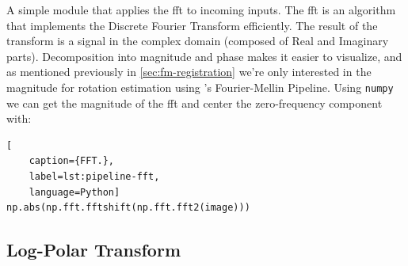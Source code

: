 A simple module that applies the \acrshort{fft} to incoming inputs. The \acrshort{fft} is an algorithm that implements the Discrete Fourier Transform efficiently. The result of the transform is a signal in the complex domain (composed of Real and Imaginary parts). Decomposition into magnitude and phase makes it easier to visualize, and as mentioned previously in \autoref{sec:fm-registration} we're only interested in the magnitude for rotation estimation using \citeauthor{Reddy1996}'s Fourier-Mellin Pipeline. Using \texttt{numpy} we can get the magnitude of the \acrshort{fft} and center the zero-frequency component with:

\begin{lstlisting}[
    caption={FFT.},
    label=lst:pipeline-fft,
    language=Python]
np.abs(np.fft.fftshift(np.fft.fft2(image)))
\end{lstlisting}

\subsection{Log-Polar Transform}

